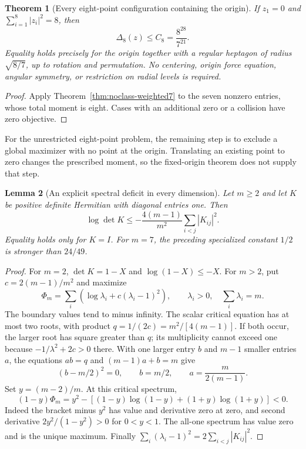 \documentclass[11pt]{article}
\newtheorem{theorem}{Theorem}[section]
\newtheorem{lemma}[theorem]{Lemma}
\theoremstyle{remark}
\numberwithin{equation}{section}
\begin{document}
\begin{theorem}[Every eight-point configuration containing the origin]
\label{thm:noclass-origin8}
If $z_1=0$ and $\sum_{i=1}^8|z_i|^2=8$, then
\[
 \boxed{\displaystyle
 \Delta_8(z)\le C_8=\frac{8^{28}}{7^{21}}.}
\]
Equality holds precisely for the origin together with a
regular heptagon of radius $\sqrt{8/7}$, up to rotation
and permutation. No centering, origin force equation,
angular symmetry, or restriction on radial levels is required.
\end{theorem}
\begin{proof}
Apply Theorem~\ref{thm:noclass-weighted7} to the seven
nonzero entries, whose total moment is eight. Cases with
an additional zero or a collision have zero objective.
\end{proof}

For the unrestricted eight-point problem, the remaining step
is to exclude a global maximizer with no point at the origin.
Translating an existing point to zero changes the prescribed
moment, so the fixed-origin theorem does not supply that step.

\begin{lemma}[An explicit spectral deficit in every dimension]
\label{lem:noclass-general-gram}
Let $m\ge2$ and let $K$ be positive definite Hermitian with
diagonal entries one. Then
\[
 \boxed{\displaystyle
 \log\det K\le-\frac{4(m-1)}{m^2}
       \sum_{i<j}|K_{ij}|^2.}
\]
Equality holds only for $K=I$. For $m=7$, the preceding
specialized constant $1/2$ is stronger than $24/49$.
\end{lemma}
\begin{proof}
For $m=2$, $\det K=1-X$ and $\log(1-X)\le-X$.
For $m>2$, put $c=2(m-1)/m^2$ and maximize
\[
 \Phi_m=\sum_i\left(\log\lambda_i+c(\lambda_i-1)^2\right),
 \qquad \lambda_i>0,\quad \sum_i\lambda_i=m.
\]
The boundary values tend to minus infinity. The scalar
critical equation has at most two roots, with product
$q=1/(2c)=m^2/[4(m-1)]$. If both occur, the larger root
has square greater than $q$; its multiplicity cannot exceed
one because $-1/\lambda^2+2c>0$ there.
With one larger entry $b$ and $m-1$ smaller entries $a$,
the equations $ab=q$ and $(m-1)a+b=m$ give
\[
 (b-m/2)^2=0,\qquad
 b=m/2,\qquad a=\frac{m}{2(m-1)}.
\]
Set $y=(m-2)/m$. At this critical spectrum,
\[
 (1-y)\Phi_m=
 y^2-\left[(1-y)\log(1-y)+(1+y)\log(1+y)\right]<0.
\]
Indeed the bracket minus $y^2$ has value and derivative
zero at zero, and second derivative
$2y^2/(1-y^2)>0$ for $0<y<1$.
The all-one spectrum has value zero and is the unique maximum.
Finally $\sum_i(\lambda_i-1)^2=2\sum_{i<j}|K_{ij}|^2$.
\end{proof}
\end{document}
